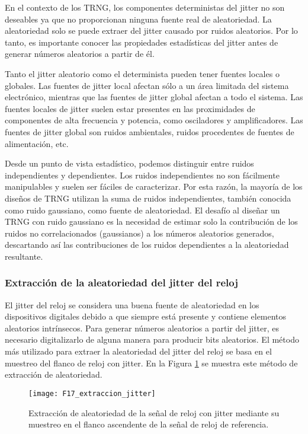                 En el contexto de los TRNG, los componentes deterministas del jitter no son deseables ya que no proporcionan ninguna fuente real de aleatoriedad. La aleatoriedad solo se puede extraer del jitter causado por ruidos aleatorios. Por lo tanto, es importante conocer las propiedades estadísticas del jitter antes de generar números aleatorios a partir de él.

                Tanto el jitter aleatorio como el determinista pueden tener fuentes locales o globales. Las fuentes de jitter local afectan sólo a un área limitada del sistema electrónico, mientras que las fuentes de jitter global afectan a todo el sistema. Las fuentes locales de jitter suelen estar presentes en las proximidades de componentes de alta frecuencia y potencia, como osciladores y amplificadores. Las fuentes de jitter global son ruidos ambientales, ruidos procedentes de fuentes de alimentación, etc. 

                Desde un punto de vista estadístico, podemos distinguir entre ruidos independientes y dependientes. Los ruidos independientes no son fácilmente manipulables y suelen ser fáciles de caracterizar. Por esta razón, la mayoría de los diseños de TRNG utilizan la suma de ruidos independientes, también conocida como ruido gaussiano, como fuente de aleatoriedad. El desafío al diseñar un TRNG con ruido gaussiano es la necesidad de estimar solo la contribución de los ruidos no correlacionados (gaussianos) a los números aleatorios generados, descartando así las contribuciones de los ruidos dependientes a la aleatoriedad resultante.

            \subsubsection{Extracción de la aleatoriedad del jitter del reloj}

                El jitter del reloj se considera una buena fuente de aleatoriedad en los dispositivos digitales debido a que siempre está presente y contiene elementos aleatorios intrínsecos. Para generar números aleatorios a partir del jitter, es necesario digitalizarlo de alguna manera para producir bits aleatorios. El método más utilizado para extraer la aleatoriedad del jitter del reloj se basa en el muestreo del flanco de reloj con jitter. En la Figura \ref{fig:F17_extraccion_jitter} se muestra este método de extracción de aleatoriedad.

                \begin{figure}[hbtp]
                    \caption{Extracción de aleatoriedad de la señal de reloj con jitter mediante su muestreo en el flanco ascendente de la señal de reloj de referencia.}
                    \centering
                    \texttt{[image: F17\_extraccion\_jitter]}
                    \label{fig:F17_extraccion_jitter}
                \end{figure}

